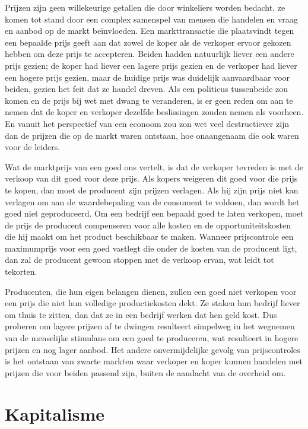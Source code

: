 \documentclass[
  a5paper,
  smalldemyvopaper,11pt,twoside,onecolumn,openright,extrafontsizes,
hidelinks]{memoir}
\begin{document}
Prijzen zijn geen willekeurige getallen die door winkeliers worden
bedacht, ze komen tot stand door een complex samenspel van mensen die
handelen en vraag en aanbod op de markt beïnvloeden. Een markttransactie
die plaatsvindt tegen een bepaalde prijs geeft aan dat zowel de koper
als de verkoper ervoor gekozen hebben om deze prijs te accepteren.
Beiden hadden natuurlijk liever een andere prijs gezien; de koper had
liever een lagere prijs gezien en de verkoper had liever een hogere
prijs gezien, maar de huidige prijs was duidelijk aanvaardbaar voor
beiden, gezien het feit dat ze handel dreven. Als een politicus
tussenbeide zou komen en de prijs bij wet met dwang te veranderen, is er
geen reden om aan te nemen dat de koper en verkoper dezelfde
beslissingen zouden nemen als voorheen. En vanuit het perspectief van
een econoom zou zon wet veel destructiever zijn dan de prijzen die op de
markt waren ontstaan, hoe onaangenaam die ook waren voor de leiders.

Wat de marktprijs van een goed ons vertelt, is dat de verkoper tevreden
is met de verkoop van dit goed voor deze prijs. Als kopers weigeren dit
goed voor die prijs te kopen, dan moet de producent zijn prijzen
verlagen. Als hij zijn prijs niet kan verlagen om aan de waardebepaling
van de consument te voldoen, dan wordt het goed niet geproduceerd. Om
een bedrijf een bepaald goed te laten verkopen, moet de prijs de
producent compenseren voor alle kosten en de opportuniteitskosten die
hij maakt om het product beschikbaar te maken. Wanneer prijscontrole een
maximumprijs voor een goed vastlegt die onder de kosten van de producent
ligt, dan zal de producent gewoon stoppen met de verkoop ervan, wat
leidt tot tekorten.

Producenten, die hun eigen belangen dienen, zullen een goed niet
verkopen voor een prijs die niet hun volledige productiekosten dekt. Ze
staken hun bedrijf liever om thuis te zitten, dan dat ze in een bedrijf
werken dat hen geld kost. Dus proberen om lagere prijzen af te dwingen
resulteert simpelweg in het wegnemen van de menselijke stimulans om een
goed te produceren, wat resulteert in hogere prijzen en nog lager
aanbod. Het andere onvermijdelijke gevolg van prijscontroles is het
ontstaan van zwarte markten waar verkoper en koper kunnen handelen met
prijzen die voor beiden passend zijn, buiten de aandacht van de overheid
om.

\chapter{Kapitalisme}\label{sec-kapitalisme}
\end{document}
